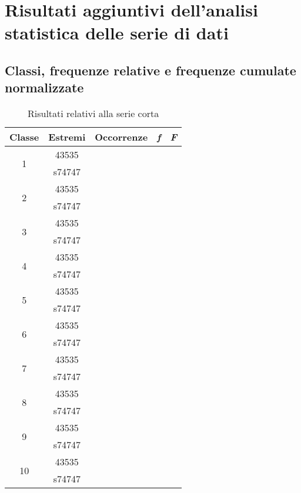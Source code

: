 \section{Risultati aggiuntivi dell'analisi statistica delle serie di dati}


\subsection{Classi, frequenze relative e frequenze cumulate normalizzate}


\begin{table}[H]
	\centering
	\begin{tabular}{c|c|c|c|c}
		\toprule
		\toprule
		\textbf{Classe}&\textbf{Estremi} &\textbf{Occorrenze}&\textbf{\textit{f}}&\textbf{\textit{F}}\\
		\midrule
		\midrule
		\multirow{2}{*}{1}&43535&\multirow{2}{*}{}&\multirow{2}{*}{}&\multirow{2}{*}{} \\
		&s74747&&&\\
		\midrule
		\multirow{2}{*}{2}&43535&\multirow{2}{*}{}&\multirow{2}{*}{}&\multirow{2}{*}{} \\
		&s74747&&&\\
		\midrule
		\multirow{2}{*}{3}&43535&\multirow{2}{*}{}&\multirow{2}{*}{}&\multirow{2}{*}{} \\
		&s74747&&&\\
		\midrule
		\multirow{2}{*}{4}&43535&\multirow{2}{*}{}&\multirow{2}{*}{}&\multirow{2}{*}{} \\
		&s74747&&&\\
		\midrule
		\multirow{2}{*}{5}&43535&\multirow{2}{*}{}&\multirow{2}{*}{}&\multirow{2}{*}{} \\
		&s74747&&&\\
		\midrule
		\multirow{2}{*}{6}&43535&\multirow{2}{*}{}&\multirow{2}{*}{}&\multirow{2}{*}{} \\
		&s74747&&&\\
		\midrule
		\multirow{2}{*}{7}&43535&\multirow{2}{*}{}&\multirow{2}{*}{}&\multirow{2}{*}{} \\
		&s74747&&&\\
		\midrule
		\multirow{2}{*}{8}&43535&\multirow{2}{*}{}&\multirow{2}{*}{}&\multirow{2}{*}{} \\
		&s74747&&&\\
		\midrule
		\multirow{2}{*}{9}&43535&\multirow{2}{*}{}&\multirow{2}{*}{}&\multirow{2}{*}{} \\
		&s74747&&&\\
		\midrule
		\multirow{2}{*}{10}&43535&\multirow{2}{*}{}&\multirow{2}{*}{}&\multirow{2}{*}{} \\
		&s74747&&&\\
		\bottomrule
		\bottomrule
	\end{tabular}
	\caption{Risultati relativi alla serie corta}
	\label{tab:seriecorta}
\end{table} 
